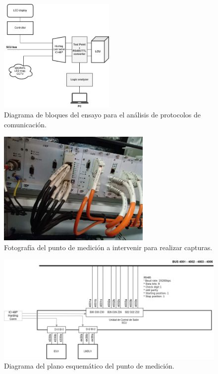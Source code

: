 \documentclass[
11pt, %
]{charter}
\begin{document}
\begin{figure}[htpb]
\centering 
\includegraphics[width=0.5\textwidth]{./Pics/sniffingDiagram.drawio.png}
\caption{Diagrama de bloques del ensayo para el análisis de protocolos de comunicación.}
\label{fig:sniffingDiagram}
\end{figure}


\begin{figure}[htpb]
\centering 
\includegraphics[width=0.66\textwidth]{./Pics/IMG_20210322_122403.jpg}
\caption{Fotografía del punto de medición a intervenir para realizar capturas.}
\label{fig:NOsniffingPhoto}
\end{figure}


\begin{figure}[htpb]
\centering 
\includegraphics[width=1\textwidth]{./Pics/RedPIDS.drawio.png}
\caption{Diagrama del plano esquemático del punto de medición.}
\label{fig:test point SCU-PIDS diagram}
\end{figure}
\end{document}
